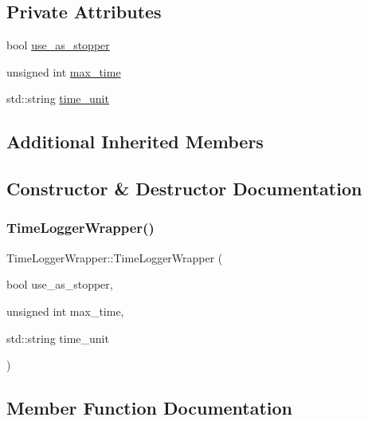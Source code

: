 \subsection*{Private Attributes}
\begin{DoxyCompactItemize}
\item 
bool \mbox{\hyperlink{class_time_logger_wrapper_a00f5b655adb9bf054e6f0b8f7b8be225}{use\+\_\+as\+\_\+stopper}}
\item 
unsigned int \mbox{\hyperlink{class_time_logger_wrapper_a94de9106fdc84bc8b061bd9a76ec04d0}{max\+\_\+time}}
\item 
std\+::string \mbox{\hyperlink{class_time_logger_wrapper_a24bb4a8e236cc934bee6f811c0337dc9}{time\+\_\+unit}}
\end{DoxyCompactItemize}
\subsection*{Additional Inherited Members}


\subsection{Constructor \& Destructor Documentation}
\mbox{\label{class_time_logger_wrapper_a820564b1ee8a2944d3b73aef3a460d21}} 
\subsubsection{\texorpdfstring{Time\+Logger\+Wrapper()}{TimeLoggerWrapper()}}
{\footnotesize\ttfamily Time\+Logger\+Wrapper\+::\+Time\+Logger\+Wrapper (\begin{DoxyParamCaption}\item[{bool}]{use\+\_\+as\+\_\+stopper,  }\item[{unsigned int}]{max\+\_\+time,  }\item[{std\+::string}]{time\+\_\+unit }\end{DoxyParamCaption})\hspace{0.3cm}{\ttfamily [inline]}}



\subsection{Member Function Documentation}
\mbox{\label{class_time_logger_wrapper_a85e2772d6dbb9de70b3a99eb1f858c83}} 
